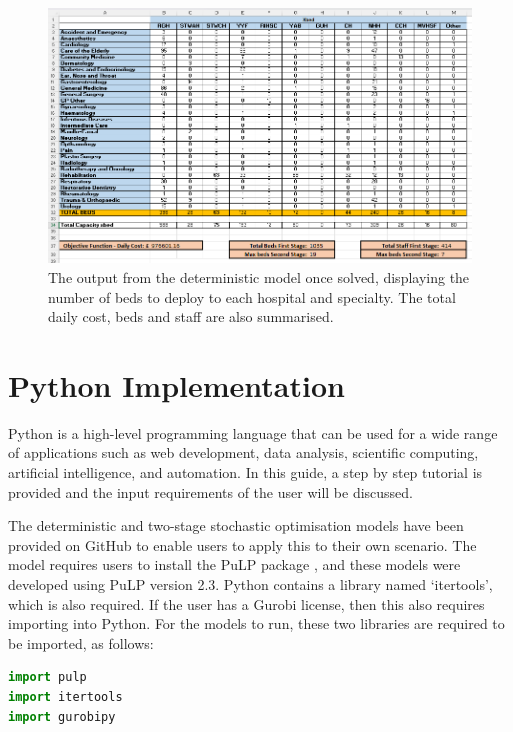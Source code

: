 \documentclass[../thesis.tex]{subfiles}
\begin{document}
\begin{figure}
    \centering
    \includegraphics[width=\textwidth]{Chapters/Chapter7/Figures/TestCfin.png}
    \caption{The output from the deterministic model once solved, displaying the number of beds to deploy to each hospital and specialty. The total daily cost, beds and staff are also summarised. }
    \label{fig:testcfin}
\end{figure}

\newpage
\section{Python Implementation}\label{sec:pythonimpl}
Python is a high-level programming language that can be used for a wide range of applications such as web development, data analysis, scientific computing, artificial intelligence, and automation. In this guide, a step by step tutorial is provided and the input requirements of the user will be discussed. 

The deterministic and two-stage stochastic optimisation models have been provided on GitHub \cite{Williams2023} to enable users to apply this to their own scenario. The model requires users to install the PuLP package \cite{Mitchell2019}, and these models were developed using PuLP version 2.3. Python contains a library named `itertools', which is also required. If the user has a Gurobi license, then this also requires importing into Python. For the models to run, these two libraries are required to be imported, as follows:

\begin{lstlisting}[language = python]
import pulp
import itertools
import gurobipy
\end{lstlisting}
\end{document}
